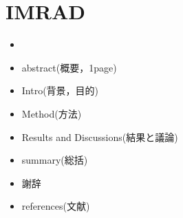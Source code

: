\chapter{IMRAD}\label{imrad}

\begin{itemize}
\item
\item
  abstract(概要，1page)
\item
  Intro(背景，目的)
\item
  Method(方法)
\item
  Results and Discussions(結果と議論)
\item
  summary(総括)
\item
  謝辞
\item
  references(文献)
\end{itemize}

    